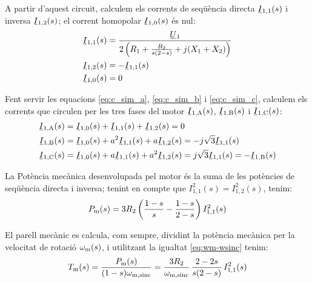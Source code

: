 \begin{center}
	
	\label{pic:mot-esq-equiv-fase-oberta}
\end{center}

A partir d'aquest circuit, calculem els corrents de seqüència directa $\cmplx{I}_{1,1}(s)$ i  inversa $\cmplx{I}_{1,2}(s)$; el corrent homopolar $\cmplx{I}_{1,0}(s)$ és nul:
\begin{subequations}
\begin{align}
	\cmplx{I}_{1,1}(s) &= \frac{\cmplx{U}_1}{2 \left( R_1 + \frac{ R_2}{s(2-s)} + j (X_1+X_2) \right)}\label{eq:I-op-1} \\
	\cmplx{I}_{1,2}(s)  &= -\cmplx{I}_{1,1}(s)\label{eq:I-op-2} \\
	\cmplx{I}_{1,0}(s)  &= 0\label{eq:I-op-0}
\end{align}
\end{subequations}
	
Fent servir les equacions	\eqref{eq:c_sim_a}, \eqref{eq:c_sim_b} i \eqref{eq:c_sim_c}, calculem els corrents que circulen per les tres fases del motor $\cmplx{I}\ped{1,A}(s)$, $\cmplx{I}\ped{1,B}(s)$ i $\cmplx{I}\ped{1,C}(s)$:
\begin{subequations}
\begin{align}
	\cmplx{I}\ped{1,A}(s) &=  \cmplx{I}_{1,0}(s) + \cmplx{I}_{1,1}(s) + \cmplx{I}_{1,2}(s) = 0\label{eq:I-op-A} \\
	\cmplx{I}\ped{1,B}(s)  &=  \cmplx{I}_{1,0}(s) + a^2 \cmplx{I}_{1,1}(s) + a \cmplx{I}_{1,2}(s) = -j \sqrt{3}  \cmplx{I}_{1,1}(s)\label{eq:I-op-B} \\
	\cmplx{I}\ped{1,C}(s)  &=  \cmplx{I}_{1,0}(s) + a \cmplx{I}_{1,1}(s) + a^2 \cmplx{I}_{1,2}(s) = j \sqrt{3}  \cmplx{I}_{1,1}(s) = -\cmplx{I}\ped{1,B}(s)\label{eq:I-op-C}
\end{align}
\end{subequations}

 
La Potència mecànica desenvolupada pel motor és la suma de les potències de seqüència directa i inversa;  tenint en compte que $I_{1,1}^2(s) = I_{1,2}^2(s)$, tenim:
\begin{equation}
	P_\mathrm{m}(s) = 3 R_2 \left(\frac{1-s}{s} - \frac{1-s}{2-s} \right) I_{1,1}^2(s)\label{eq:P_m-op}
\end{equation}

El parell mecànic es calcula, com sempre, dividint la potència mecànica per la velocitat de rotació $\omega_\mathrm{m}(s)$, i utilitzant la igualtat \eqref{eq:wm-wsinc} tenim:
\begin{equation}
	T_\mathrm{m}(s) = \frac{P_\mathrm{m}(s)}{(1-s) \omega_\mathrm{m,sinc}} = \frac{3 R_2}{\omega_\mathrm{m,sinc}} \,\frac{2-2s}{s(2-s)}  \,I_{1,1}^2(s)\label{eq:T_m-op}
\end{equation}
	    	    
